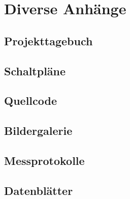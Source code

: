 

\chapter{Diverse Anhänge}


\section{Projekttagebuch}


\section{Schaltpläne}


\section{Quellcode}


\section{Bildergalerie}


\section{Messprotokolle}


\section{Datenblätter}